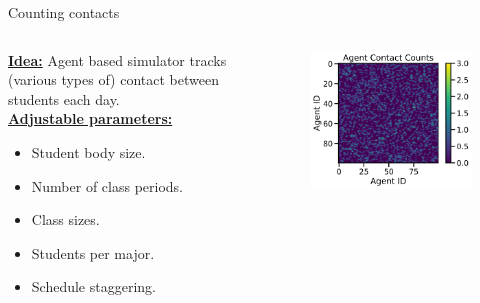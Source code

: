 \documentclass[aspectratio=169]{beamer}
\begin{document}
\begin{frame}{Counting contacts}
    \vfill
    \pause
    \begin{columns}
    \begin{column}{.5\textwidth}
    \textbf{\underline{Idea:}} Agent based simulator tracks (various types of) contact between students each day.\\
    \vspace*{1cm}
    \textbf{\underline{Adjustable parameters:}}
    \begin{itemize}
        \item Student body size.
        \item Number of class periods.
        \item Class sizes.
        \item Students per major.
        \item Schedule staggering.
    \end{itemize}
    \end{column}
    \begin{column}{.5\textwidth}
        \begin{figure}[H]
            \centering
            \includegraphics[width=\textwidth]{figures/contact_matrix.png}
        \end{figure}
    \end{column}
    \end{columns}
    \vfill
\end{frame}
\end{document}
